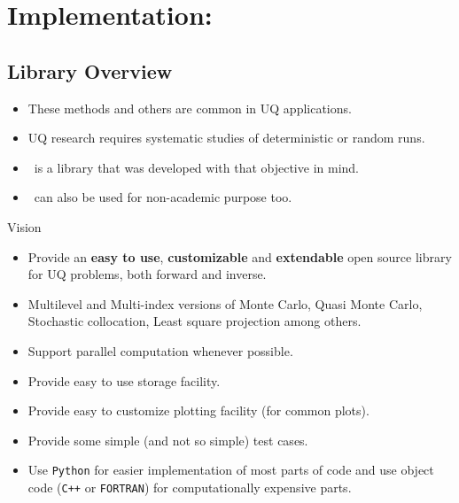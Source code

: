 

\section{Implementation: \lib}
\subsection{Library Overview}
\begin{frame}
  \begin{itemize}
  \item These methods and others are common in UQ applications.
  \item UQ research requires \alert{systematic} studies of
    deterministic or random runs.
  \item \lib~is a library that was developed with that
    objective in mind.
  \item \lib~can also be used for non-academic purpose too.
  \end{itemize}
\end{frame}

\begin{frame}{Vision}
  \begin{itemize}
  \item Provide an \textbf{easy to use}, \textbf{customizable} and
    \textbf{extendable} open source library for UQ problems, both
    forward and inverse.
  \item Multilevel and Multi-index versions of Monte Carlo, Quasi Monte
    Carlo, Stochastic collocation, Least square projection among
    others.
  \item Support parallel computation whenever possible.
  \item Provide easy to use storage facility.
  \item Provide easy to customize plotting facility (for common
    plots).
  \item Provide some simple (and not so simple) test cases.
  \item Use \texttt{Python} for easier implementation of most parts of code
    and use object code (\texttt{C++} or \texttt{FORTRAN}) for
    computationally expensive parts.
  \end{itemize}
\end{frame}

